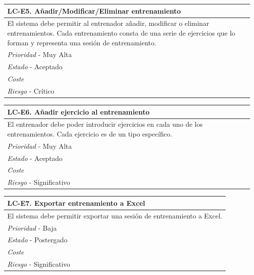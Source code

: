	\begin{center}
		\begin{tabularx}{15cm}{|X|}
			\hline 
				\bf{LC-E5. Añadir/Modificar/Eliminar entrenamiento}\\
			\hline
				El sistema debe permitir al entrenador añadir, modificar o eliminar entrenamientos. Cada entrenamiento consta de una serie de ejercicios que lo forman y representa una sesión de entrenamiento.\\
			\hline
				{\it Prioridad} - Muy Alta\\
			\hline
				{\it Estado} - Aceptado\\
			\hline
				{\it Coste}\\
			\hline
				{\it Riesgo} - Crítico\\
			\hline
		\end{tabularx}
	\end{center}
	
	\begin{center}
		\begin{tabularx}{15cm}{|X|}
			\hline 
				\bf{LC-E6. Añadir ejercicio al entrenamiento}\\
			\hline
				El entrenador debe poder introducir ejercicios en cada uno de los entrenamientos. Cada ejercicio es de un tipo específico.\\
			\hline
				{\it Prioridad} - Muy Alta\\
			\hline
				{\it Estado} - Aceptado\\
			\hline
				{\it Coste}\\
			\hline
				{\it Riesgo} - Significativo\\
			\hline
		\end{tabularx}
	\end{center}
	
	\begin{center}
		\begin{tabularx}{15cm}{|X|}
			\hline 
				\bf{LC-E7. Exportar entrenamiento a Excel}\\
			\hline
				El sistema debe permitir exportar una sesión de entrenamiento a Excel.\\
			\hline
				{\it Prioridad} - Baja\\
			\hline
				{\it Estado} - Postergado\\
			\hline
				{\it Coste}\\
			\hline
				{\it Riesgo} - Significativo\\
			\hline
		\end{tabularx}
	\end{center}
	
